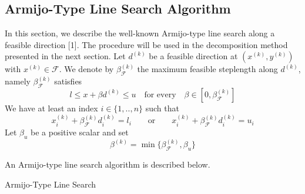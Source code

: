 \subsection{Armijo-Type Line Search Algorithm}
In this section, we describe the well-known Armijo-type line search along a feasible direction [1]. The procedure will be used in the decomposition method presented in the next section. Let $d^{(k)}$ be a feasible direction at $(x^{(k)}, y^{(k)})$ with $x^{(k)} \in \mathcal{F}$. We denote by $\beta_{\mathcal{F}}^{(k)}$ the maximum feasible steplength along $d^{(k)}$, namely $\beta_{\mathcal{F}}^{(k)}$ satisfies
\begin{equation*}
l \leq x + \beta d^{(k)} \leq u \quad \text{for every} \quad \beta \in [ 0, \beta_{\mathcal{F}}^{(k)} ]
\end{equation*}
We have at least an index $i \in \{1, .., n\}$ such that
\begin{equation*}
x_i^{(k)} + \beta_{\mathcal{F}}^{(k)} d_i^{(k)} = l_i \qquad \text{or} \qquad x_i^{(k)} + \beta_{\mathcal{F}}^{(k)} d_i^{(k)} = u_i 
\end{equation*}
Let $\beta_u$ be a positive scalar and set
\begin{equation}
\beta^{(k)} = \min \{\beta_{\mathcal{F}}^{(k)}, \beta_u\}
\end{equation}

\hspace{-1.8em}An Armijo-type line search algorithm is described below.\\
\begin{algorithm}
 \caption{Armijo-Type Line Search}
\end{algorithm}
